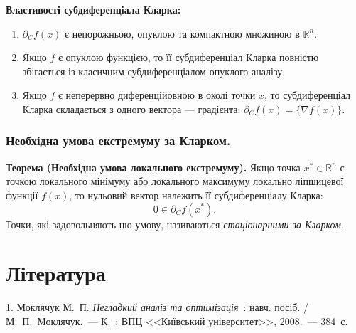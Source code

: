 \documentclass[12pt,a4paper]{extarticle}
\numberwithin{section}{part}
\begin{document}
\textbf{Властивості субдиференціала Кларка:}
\begin{enumerate}
    \item $\partial_C f(x)$ є непорожньою, опуклою та компактною множиною в $\mathbb{R}^n$.
    \item Якщо $f$ є опуклою функцією, то її субдиференціал Кларка повністю збігається із класичним субдиференціалом опуклого аналізу.
    \item Якщо $f$ є неперервно диференційовною в околі точки $x$, то субдиференціал Кларка складається з одного вектора --- градієнта: $\partial_C f(x) = \{ \nabla f(x) \}$.
\end{enumerate}

\section{Необхідна умова екстремуму за Кларком.}
\textbf{Теорема (Необхідна умова локального екстремуму).} Якщо точка $x^* \in \mathbb{R}^n$ є точкою локального мінімуму або локального максимуму локально ліпшицевої функції $f(x)$, то нульовий вектор належить її субдиференціалу Кларка:
$$
0 \in \partial_C f(x^*).
$$
Точки, які задовольняють цю умову, називаються \textit{стаціонарними за Кларком}.



\part*{Література}

\noindent\hangindent=1.25cm
1. Моклячук М.~П. \emph{Негладкий аналіз та оптимізація}~: навч. посіб. / М.~П.~Моклячук.~--- К.~: ВПЦ <<Київський університет>>, 2008.~--- 384~с.
\end{document}
